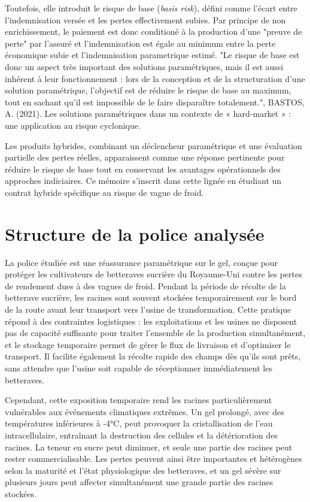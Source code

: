 \documentclass[11pt,a4paper,openright,twoside]{report}
\begin{document}
Toutefois, elle introduit le risque de base (\textit{basis risk}), défini comme l’écart entre l’indemnisation versée et les pertes effectivement subies. Par principe de non enrichissement, le paiement est donc conditioné à la production d'une "preuve de perte" par l'assuré et l'indemnisation est égale au minimum entre la perte économique subie et l'indemnisation parametrique estimé. "Le risque de base est donc un aspect très important des solutions paramétriques, mais il
est aussi inhérent à leur fonctionnement : lors de la conception et de la structuration d’une
solution paramétrique, l’objectif est de réduire le risque de base au maximum, tout en sachant
qu’il est impossible de le faire disparaître totalement.", BASTOS, A. (2021). Les solutions paramétriques dans un contexte de « hard-market » : une application au risque cyclonique.

Les produits hybrides, combinant un déclencheur paramétrique et une évaluation partielle des pertes réelles, apparaissent comme une réponse pertinente pour réduire le risque de base tout en conservant les avantages opérationnels des approches indiciaires. Ce mémoire s’inscrit dans cette lignée en étudiant un contrat hybride spécifique au risque de vague de froid.  
\section{Structure de la police analysée}

La police étudiée est une réassurance paramétrique sur le gel, conçue pour protéger les cultivateurs de betteraves sucrière du Royaume-Uni contre les pertes de rendement dues à des vagues de froid. 
Pendant la période de récolte de la betterave sucrière, les racines sont souvent stockées temporairement sur le bord de la route avant leur transport vers l’usine de transformation. Cette pratique répond à des contraintes logistiques : les exploitations et les usines ne disposent pas de capacité suffisante pour traiter l’ensemble de la production simultanément, et le stockage temporaire permet de gérer le flux de livraison et d’optimiser le transport. Il facilite également la récolte rapide des champs dès qu’ils sont prêts, sans attendre que l’usine soit capable de réceptionner immédiatement les betteraves.

Cependant, cette exposition temporaire rend les racines particulièrement vulnérables aux événements climatiques extrêmes. Un gel prolongé, avec des températures inférieures à -4°C, peut provoquer la cristallisation de l’eau intracellulaire, entraînant la destruction des cellules et la détérioration des racines. La teneur en sucre peut diminuer, et seule une partie des racines peut rester commercialisable. Les pertes peuvent ainsi être importantes et hétérogènes selon la maturité et l’état physiologique des betteraves, et un gel sévère sur plusieurs jours peut affecter simultanément une grande partie des racines stockées.
\end{document}
